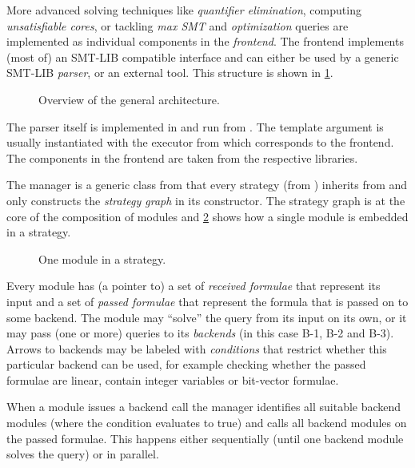 More advanced solving techniques like \emph{quantifier elimination}, computing \emph{unsatisfiable cores}, or tackling \emph{max SMT} and \emph{optimization} queries are implemented as individual components in the \emph{frontend}.
The frontend implements (most of) an SMT-LIB compatible interface and can either be used by a generic SMT-LIB \emph{parser}, or an external tool.
This structure is shown in \cref{fig:smtrat-architecture}.

\begin{figure}[ht]
	\centering
	
	\caption{Overview of the general \smtrat architecture.}\label{fig:smtrat-architecture}
\end{figure}

The parser itself is implemented in  and run from . The template argument  is usually instantiated with the executor from  which corresponds to the frontend.
The components in the frontend are taken from the respective \smtrat libraries.

The manager is a generic class from  that every strategy (from ) inherits from and only constructs the \emph{strategy graph} in its constructor.
The strategy graph is at the core of the composition of \smtrat modules and \cref{fig:module-in-strategy} shows how a single module is embedded in a strategy.

\begin{figure}[ht]
	\centering
	
	\caption{One \smtrat module in a strategy.}\label{fig:module-in-strategy}
\end{figure}

Every module has (a pointer to) a set of \emph{received formulae} that represent its input and a set of \emph{passed formulae} that represent the formula that is passed on to some backend.
The module may ``solve'' the query from its input on its own, or it may pass (one or more) queries to its \emph{backends} (in this case B-1, B-2 and B-3).
Arrows to backends may be labeled with \emph{conditions} that restrict whether this particular backend can be used, for example checking whether the passed formulae are linear, contain integer variables or bit-vector formulae.

When a module issues a backend call the manager identifies all suitable backend modules (where the condition evaluates to true) and calls all backend modules on the passed formulae. This happens either sequentially (until one backend module solves the query) or in parallel.

